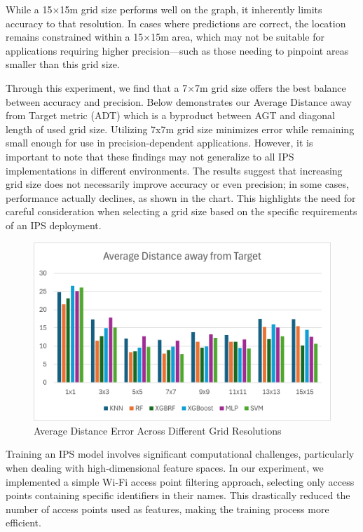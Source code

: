 \documentclass[conference]{IEEEtran}
\begin{document}
	While a 15×15m grid size performs well on the graph, it inherently limits accuracy to that resolution. In cases where predictions are correct, the location remains constrained within a 15×15m area, which may not be suitable for applications requiring higher precision—such as those needing to pinpoint areas smaller than this grid size.
	
	Through this experiment, we find that a 7×7m grid size offers the best balance between accuracy and precision. Below demonstrates our Average Distance away from Target metric (ADT) which is a byproduct between AGT and diagonal length of used grid size. Utilizing 7x7m grid size minimizes error while remaining small enough for use in precision-dependent applications. However, it is important to note that these findings may not generalize to all IPS implementations in different environments. The results suggest that increasing grid size does not necessarily improve accuracy or even precision; in some cases, performance actually declines, as shown in the chart. This highlights the need for careful consideration when selecting a grid size based on the specific requirements of an IPS deployment.
	
	
	\begin{figure}[htbp]
		\centerline{\includegraphics[scale=0.65]{image2.png}}
		\caption{Average Distance Error Across Different Grid Resolutions}
		\label{fig:Avg_dis_err}
	\end{figure}
	
	
	
	Training an IPS model involves significant computational challenges, particularly when dealing with high-dimensional feature spaces. In our experiment, we implemented a simple Wi-Fi access point filtering approach, selecting only access points containing specific identifiers in their names. This drastically reduced the number of access points used as features, making the training process more efficient.
	
\end{document}
